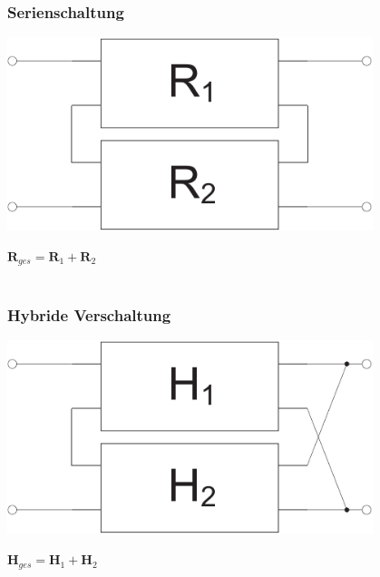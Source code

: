 \documentclass[a4paper,twocolumn,10pt]{article}
\begin{document}
\subsubsection*{Serienschaltung}
\begin{minipage}[b]{0.23\textwidth}
\includegraphics[width=0.8\textwidth]{img/Zweitor_Seriell}
\end{minipage}
\hfill
\begin{minipage}[b]{0.23\textwidth}
$\textbf{R}_{ges}=\textbf{R}_1+\textbf{R}_2$\\\\
\end{minipage}

\subsubsection*{Hybride Verschaltung}
\begin{minipage}[b]{0.23\textwidth}
\includegraphics[width=0.8\textwidth]{img/Zweitor_Hybrid}
\end{minipage}
\hfill
\begin{minipage}[b]{0.23\textwidth}
$\textbf{H}_{ges}=\textbf{H}_1+\textbf{H}_2$\\\\
\end{minipage}
\end{document}
